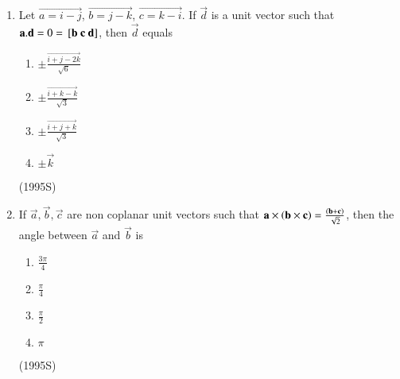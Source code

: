 \documentclass[journal,12pt,twocolumn]{IEEEtran}
\theoremstyle{remark}
\begin{document}
\begin{enumerate}
\item Let $\vec{a=i-j}$, $\vec{b=j-k}$, $\vec{c=k-i}$. If $\vec{d}$ is a unit vector such that $\mathbf{a}.\mathbf{d} = 0 = {}\left[\mathbf{b}\ \mathbf{c}\ \mathbf{d}\right]$, then $\vec{d}$ equals
\begin{enumerate}
\item $\pm \frac{\vec{i+j-2k}}{\sqrt{6}}$
\item $\pm \frac{\vec{i+k-k}}{\sqrt{3}}$
\item $\pm \frac{\vec{i+j+k}}{\sqrt{3}}$
\item $\pm \vec{k}$
\end{enumerate}
\hfill (1995S)

\item If $\vec{a},\vec{b},\vec{c}$ are non coplanar unit vectors such that $\mathbf{a}\times\left(\mathbf{b}\times\mathbf{c}\right) = \frac{\left(\mathbf{b}+\mathbf{c}\right)}{\sqrt{2}}$, then the angle between $\vec{a}$ and $\vec{b}$ is
\begin{enumerate}
\item $\frac{3\pi}{4}$
\item $\frac{\pi}{4}$
\item $\frac{\pi}{2}$
\item $\pi$
\end{enumerate}
\hfill (1995S)
\end{enumerate}
\end{document}
